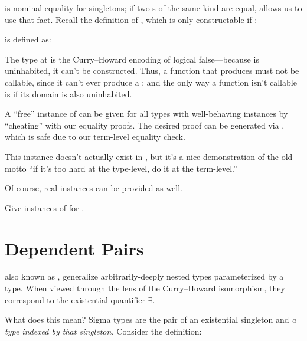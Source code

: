 \documentclass[book.tex]{subfiles}
\begin{document}
 is \gls{nominal} equality for singletons; if two s of the
same kind are equal,  allows us to use that fact. Recall the
definition of , which is only constructable if :


 is defined as:


The type  at  is the Curry--Howard encoding of logical
false---because  is uninhabited, it can't be constructed. Thus, a
function that produces  must not be callable, since it can't ever
produce a ; and the only way a function isn't callable is if its domain
is also uninhabited.

A ``free'' instance of  can be given for all types with
well-behaving  instances by ``cheating'' with our equality proofs. The
desired  proof can be generated via , which is
safe due to our term-level equality check.


This instance doesn't actually exist in , but it's a nice
demonstration of the old motto ``if it's too hard at the type-level, do it at
the term-level.''

Of course, real instances can be provided as well.


\begin{exercise}
Give instances of  for .
\end{exercise}
\begin{solution}
\end{solution}


\section{Dependent Pairs}


 also known as , generalize arbitrarily-deeply nested  types parameterized by a
type. When viewed through the lens of the Curry--Howard isomorphism, they
correspond to the existential quantifier $\exists$.

What does this mean? Sigma types are the pair of an existential singleton and
\emph{a type indexed by that singleton.} Consider the definition:
\end{document}
